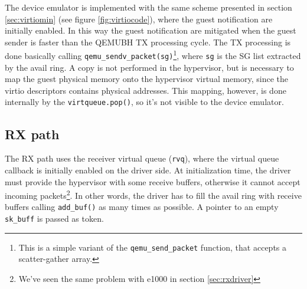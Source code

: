 \vspace{0.5cm}

The device emulator is implemented with the same scheme presented in section \ref{sec:virtiomin} (see figure \ref{fig:virtiocode}), where
the guest notification are initially enabled.
In this way the guest notification are mitigated when the guest sender is faster than the QEMUBH TX processing cycle.
The TX processing is done basically calling \texttt{qemu\_sendv\_packet(sg)}\footnote{This is a simple variant of the
\texttt{qemu\_send\_packet} function, that accepts a scatter-gather array.}, where \texttt{sg} is the SG list extracted by the avail ring.
A copy is not performed in the hypervisor, but is necessary to map the guest physical memory onto the hypervisor virtual memory, since the
virtio descriptors contains physical addresses. This mapping, however, is done internally by the \texttt{virtqueue.pop()}, so it's not
visible to the device emulator.


\subsection{RX path}
The RX path uses the receiver virtual queue (\texttt{rvq}), where the virtual queue callback is initially enabled on the driver side.
At initialization time, the driver must provide the hypervisor with some receive buffers, otherwise it cannot accept incoming
packets\footnote{We've seen the same problem with e1000 in section \ref{sec:rxdriver}}. In other words, the driver has to fill the avail
ring with receive buffers calling \texttt{add\_buf()} as many times as possible. A pointer to an empty \texttt{sk\_buff} is passed as
token.

\vspace{0.5cm}

